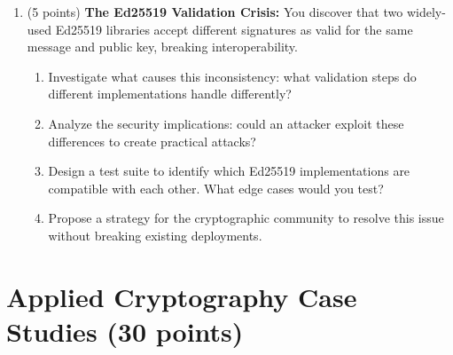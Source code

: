 \documentclass[10pt,a4paper,american]{article}
\begin{document}
\begin{enumerate}
	\item (5 points) \textbf{The Ed25519 Validation Crisis:}
	      You discover that two widely-used Ed25519 libraries accept different signatures as valid for the same message and public key, breaking interoperability.
	      \begin{enumerate}
		      \item Investigate what causes this inconsistency: what validation steps do different implementations handle differently?
		      \item Analyze the security implications: could an attacker exploit these differences to create practical attacks?
		      \item Design a test suite to identify which Ed25519 implementations are compatible with each other. What edge cases would you test?
		      \item Propose a strategy for the cryptographic community to resolve this issue without breaking existing deployments.
	      \end{enumerate}
\end{enumerate}

\section{Applied Cryptography Case Studies (30 points)}
\end{document}
